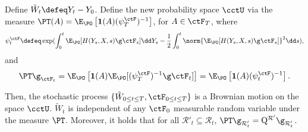 \begin{frame}
\begin{theorem} \label{theo_girsa}
Define $\tilde{W}_t\defeq Y_t-Y_0$. Define the new probability space $\cctU$ via the measure $\PT(A)=\E_{\PO}\left[ \mathbf{1}(A)({\psi^{\ctF}_T})^{-1}\right]$, for $A\in \ctF_T$, where 
\begin{equation}\label{radonniko}
\psi^{\ctF}_t\defeq \exp(\int_0^t \E_{\PO}[H(Y_s,X,s)\g\ctF_s]\dd Y_s-\frac{1}{2}\int_0^t\norm{\E_{\PO}[H(Y_s,X,s)\g\ctF_s]}^2 \dd s ),
\end{equation}
and  
$$\PT\g_{\ctF_t}=\E_{\PO}\left[ \mathbf{1}(A)\E_\PO[({\psi^{\ctF}_T})^{-1}\g\ctF_t]\right]=\E_{\PO}\left[ \mathbf{1}(A)({\psi^{\ctF}_t})^{-1}\right].$$ 


Then, the stochastic process $\{\tilde{W}_{0\leq t\leq T}, \ctF_{0\leq t\leq T}\}$ is a Brownian motion on the space $\cctU$. $\tilde{W}_t$ is independent of any $\ctF_0$ measurable random variable under the measure $\PT$. 
Moreover, it holds that for all $\mathcal{R}'_t\subseteq \mathcal{R}_t$, 
$\PT\g_{\mathcal{R}'_t}=\mathrm{Q}^{\mathcal{R}'}\g_{\mathcal{R}'_t}
$.

\end{theorem}
\end{frame}


